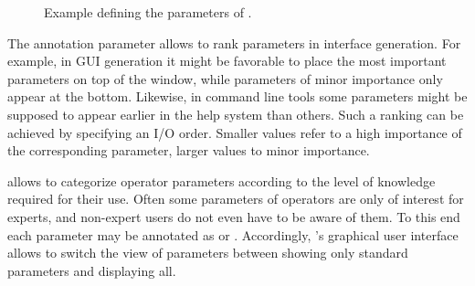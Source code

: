 \begin{figure}

\caption{\label{exa:defineParameters}Example defining the parameters of .}
\end{figure}

The annotation parameter  allows to rank parameters
in interface generation. For example, in GUI generation it might be favorable to place the most important 
parameters on top of the window, while parameters of minor importance only
appear at the bottom. Likewise, in command line tools some parameters might be
supposed to appear earlier in the help system than others.
Such a ranking can be achieved by specifying an I/O order. Smaller values refer
to a high importance of the corresponding parameter, larger values to minor importance.

\alida allows to categorize operator parameters according to the level
of knowledge required for their use. Often some parameters of operators are only of interest for experts, and non-expert users
do not even have to be aware of them. To this end each parameter may be
annotated as  or . Accordingly, \alida's graphical user
interface allows to switch the view of parameters between showing only standard parameters and
displaying all.

